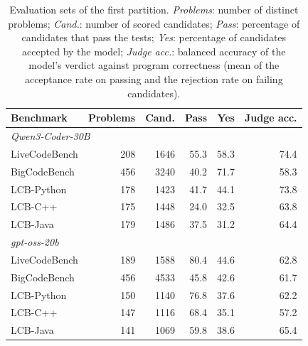 \begin{table}[t]
\centering
\caption{Evaluation sets of the first partition. \emph{Problems}: number of distinct problems; \emph{Cand.}: number
of scored candidates; \emph{Pass}: percentage of candidates that pass the tests; \emph{Yes}: percentage of candidates accepted by the model;
\emph{Judge acc.}: balanced accuracy of the model's verdict against program correctness (mean of the acceptance rate on passing and the rejection rate on failing candidates). }
\label{tab:datasets}
\begin{tabular}{l rrrrr}
\toprule
Benchmark & Problems & Cand. & Pass & Yes & Judge acc. \\
\midrule
\multicolumn{6}{l}{\emph{Qwen3-Coder-30B}} \\
LiveCodeBench & 208 & 1646 & 55.3 & 58.3 & 74.4 \\
BigCodeBench  & 456 & 3240 & 40.2 & 71.7 & 58.3 \\
LCB-Python    & 178 & 1423 & 41.7 & 44.1 & 73.8 \\
LCB-C++       & 175 & 1448 & 24.0 & 32.5 & 63.8 \\
LCB-Java      & 179 & 1486 & 37.5 & 31.2 & 64.4 \\
\midrule
\multicolumn{6}{l}{\emph{gpt-oss-20b}} \\
LiveCodeBench & 189 & 1588 & 80.4 & 44.6 & 62.8 \\
BigCodeBench  & 456 & 4533 & 45.8 & 42.6 & 61.7 \\
LCB-Python    & 150 & 1140 & 76.8 & 37.6 & 62.2 \\
LCB-C++       & 147 & 1116 & 68.4 & 35.1 & 57.2 \\
LCB-Java      & 141 & 1069 & 59.8 & 38.6 & 65.4 \\
\bottomrule
\end{tabular}
\end{table}

